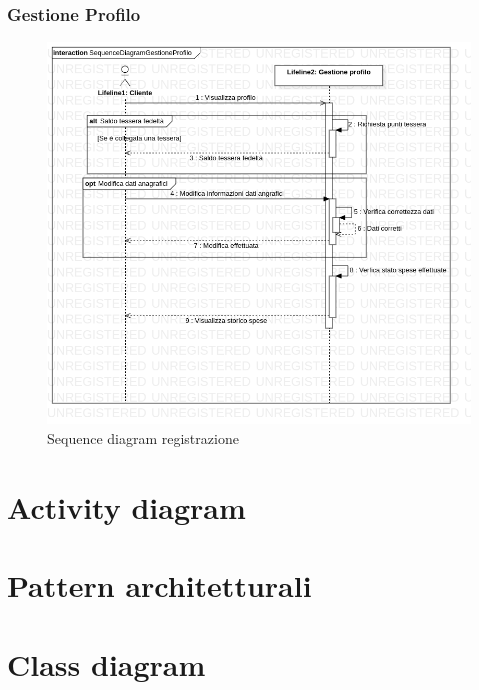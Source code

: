 \documentclass[12pt, a4paper]{article}
\numberwithin{equation}{section} %
\begin{document}
\subsubsection{Gestione Profilo}

\begin{figure}[h]
\centering
\includegraphics[width=\textwidth]{Use Case Model!Gestione profilo!InteractionGestioneProfilo!SequenceDiagramGestioneProfilo_5.png}
\caption{Sequence diagram registrazione}
\end{figure}

\section{Activity diagram}


\section{Pattern architetturali}


\section{Class diagram}

\end{document}
